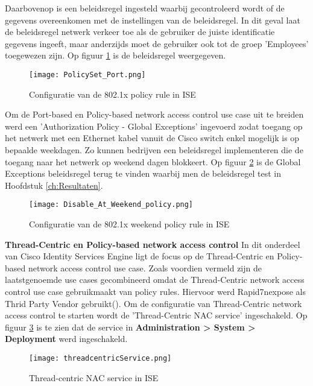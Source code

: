 	Daarbovenop is een beleidsregel ingesteld waarbij gecontroleerd wordt of de gegevens overeenkomen met de instellingen van de beleidsregel. In dit geval laat de beleidsregel netwerk verkeer toe als de gebruiker de juiste identificatie gegevens ingeeft, maar anderzijds moet de gebruiker ook tot de groep 'Employees' toegewezen zijn. Op figuur \ref{fig:ISESwitch} is de beleidsregel weergegeven.
 	
	 	 \begin{figure}[H]
		\centering
		\texttt{[image: PolicySet\_Port.png]}
		\caption{Configuratie van de 802.1x policy rule in ISE}%
		\label{fig:ISESwitch}%
		\end{figure}
	\newpage
	Om de Port-based en Policy-based network access control use case uit te breiden werd een 'Authorization Policy - Global Exceptions' ingevoerd zodat toegang op het netwerk met een Ethernet kabel vanuit de Cisco switch enkel mogelijk is op bepaalde weekdagen. Zo kunnen bedrijven een beleidsregel implementeren die de toegang naar het netwerk op weekend dagen blokkeert. Op figuur \ref{fig:weekend} is de Global Exceptions beleidsregel terug te vinden waarbij men de beleidsregel test in Hoofdstuk \ref{ch:Resultaten}. 
	
	\begin{figure}[H]
		\centering
		\texttt{[image: Disable\_At\_Weekend\_policy.png]}
		\caption{Configuratie van de 802.1x weekend policy rule in ISE}%
		\label{fig:weekend}%
	\end{figure}
\fontsize{12}{20}\textbf{Thread-Centric en Policy-based network access control }
 \newline
 \newline
 In dit onderdeel van Cisco Identity Services Engine ligt de focus op de Thread-Centric en Policy-based network access control use case. Zoals voordien vermeld zijn de laatstgenoemde use cases gecombineerd omdat de Thread-Centric network access control use case gebruikmaakt van policy rules. Hiervoor werd Rapid7\textunderscore nexpose als Thrid Party Vendor gebruikt(\cite{rapid7}).
 \newline
 \newline
 Om de configuratie van Thread-Centric network access control te starten wordt de 'Thread-Centric NAC service' ingeschakeld. Op figuur \ref{fig:serviceThread} is te zien dat de service in \textbf{Administration > System > Deployment} werd ingeschakeld.
 
\begin{figure}[H]
		 	\centering
		 	\texttt{[image: threadcentricService.png]}
		 	\caption{Thread-centric NAC service in ISE}%
		 	\label{fig:serviceThread}%
\end{figure}

